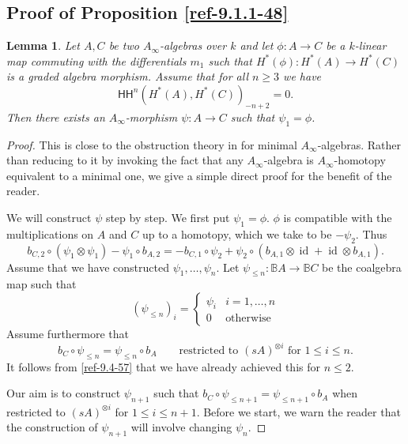 \documentclass{amsart}
\numberwithin{equation}{section}
\newtheorem{lemmas}{Lemma}[subsection]
\theoremstyle{definition}
\theoremstyle{remark}
\begin{document}
\subsection{Proof of Proposition \ref{ref-9.1.1-48}} 
\label{ref-9.3-55}
\begin{lemmas}
\label{ref-9.3.1-56}
Let $A,C$ be two $A_\infty$-algebras over $k$ and let $\phi:A{\rightarrow} C$ be a $k$-linear map commuting with the differentials $m_1$ such that $H^{\ast}(\phi):H^\ast(A){\rightarrow} H^\ast(C)$ is a graded algebra morphism. 
 Assume that for
all $n\ge 3$ we have
\[
{\mathsf{HH}}^{n}(H^\ast(A),H^\ast(C))_{-n+2}=0.
\]
Then there exists an $A_\infty$-morphism $\psi:A{\rightarrow} C$ such that $\psi_1=\phi$.
\end{lemmas}
\begin{proof}
This is close to the obstruction theory in \cite[Appendix B.4]{Lefevre} for minimal $A_\infty$-algebras. Rather
than reducing to it by invoking the fact that any $A_\infty$-algebra is $A_\infty$-homotopy equivalent to a minimal one, we give
a simple direct proof for the benefit of the reader.

We will construct $\psi$ step by step. We first put $\psi_1=\phi$. $\phi$ is compatible with the
multiplications on $A$ and $C$ up to a homotopy, which we take to be $-\psi_2$. Thus
\begin{equation}
\label{ref-9.4-57}
b_{C,2}\circ (\psi_1\otimes \psi_1) -\psi_1 \circ b_{A,2}=-b_{C,1}\circ \psi_2+\psi_2\circ (b_{A,1}\otimes {\operatorname{id}}+{\operatorname{id}}\otimes b_{A,1}).
\end{equation}
Assume that we have constructed $\psi_1,\ldots,\psi_n$. Let $\psi_{\le n}:{\mathbb{B}} A{\rightarrow} {\mathbb{B}} C$
be the coalgebra map such that 
\[
(\psi_{\le n})_i=
\begin{cases} 
\psi_i & i=1,\ldots,n\\
0&\text{otherwise}
\end{cases}
\]
 Assume furthermore that
\begin{equation}
\label{ref-9.5-58}
b_C\circ \psi_{\le n}=\psi_{\le n} \circ b_A\qquad \text{restricted to $(sA)^{\otimes i}$ for $1\le i\le n$} .
\end{equation}
It follows from \eqref{ref-9.4-57} that we have already achieved this for $n\le 2$.

Our aim is to construct $\psi_{n+1}$ such that $b_C\circ \psi_{\le n+1}=\psi_{\le n+1} \circ b_A$ 
when restricted to $(sA)^{\otimes i}$ for $1\le i\le n+1$. Before we start, we warn the reader that the construction
of $\psi_{n+1}$ will involve changing $\psi_n$.


\end{proof}
\end{document}
